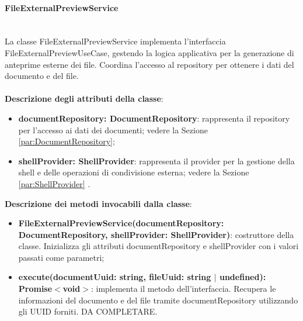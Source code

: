 \documentclass[a4paper,12pt]{article}
\begin{document}
{{                \paragraph{FileExternalPreviewService}\label{par:FileExternalPreviewService}\mbox{}\\
                La classe FileExternalPreviewService implementa l'interfaccia FileExternalPreviewUseCase, gestendo la logica applicativa per la generazione di anteprime esterne dei file. Coordina l'accesso al repository per ottenere i dati del documento e del file.\\
                \\
                \textbf{Descrizione degli attributi della classe}:
                \begin{itemize}
                    \item \textbf{documentRepository: DocumentRepository}: rappresenta il repository per l'accesso ai dati dei documenti; vedere la Sezione \ref{par:DocumentRepository};
                    \item \textbf{shellProvider: ShellProvider}: rappresenta il provider per la gestione della shell e delle operazioni di condivisione esterna; vedere la Sezione \ref{par:ShellProvider} .
                \end{itemize}
                
              \noindent \textbf{Descrizione dei metodi invocabili dalla classe}:
                \begin{itemize}
                    \item \textbf{FileExternalPreviewService(documentRepository: DocumentRepository, shellProvider: ShellProvider)}: costruttore della classe. Inizializza gli attributi documentRepository e shellProvider con i valori passati come parametri;
                    \item \textbf{execute(documentUuid: string, fileUuid: string $|$ undefined):\\ Promise$<$void$>$}: implementa il metodo dell'interfaccia. Recupera le informazioni del documento e del file tramite documentRepository utilizzando gli UUID forniti. DA COMPLETARE.
                \end{itemize}

}}
\end{document}
